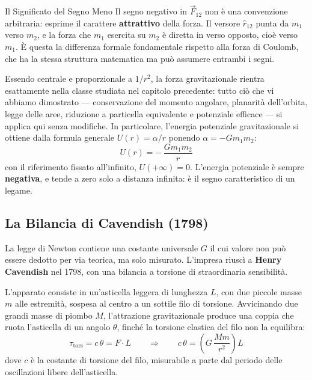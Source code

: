 \begin{attenzione}{Il Significato del Segno Meno}
Il segno negativo in $\vec{F}_{12}$ non è una convenzione arbitraria: esprime il carattere \textbf{attrattivo} della forza. Il versore $\hat{r}_{12}$ punta da $m_1$ verso $m_2$, e la forza che $m_1$ esercita su $m_2$ è diretta in verso opposto, cioè verso $m_1$. È questa la differenza formale fondamentale rispetto alla forza di Coulomb, che ha la stessa struttura matematica ma può assumere entrambi i segni.
\end{attenzione}

Essendo centrale e proporzionale a $1/r^2$, la forza gravitazionale rientra esattamente nella classe studiata nel capitolo precedente: tutto ciò che vi abbiamo dimostrato --- conservazione del momento angolare, planarità dell'orbita, legge delle aree, riduzione a particella equivalente e potenziale efficace --- si applica qui senza modifiche. In particolare, l'energia potenziale gravitazionale si ottiene dalla formula generale $U(r) = \alpha/r$ ponendo $\alpha = -Gm_1m_2$:
\begin{equation}
    U(r) = - \, \frac{G m_1 m_2}{r}
\end{equation}
con il riferimento fissato all'infinito, $U(+\infty) = 0$. L'energia potenziale è sempre \textbf{negativa}, e tende a zero solo a distanza infinita: è il segno caratteristico di un legame.

\subsection{La Bilancia di Cavendish (1798)}

La legge di Newton contiene una costante universale $G$ il cui valore non può essere dedotto per via teorica, ma solo misurato. L'impresa riuscì a \textbf{Henry Cavendish} nel 1798, con una bilancia a torsione di straordinaria sensibilità.

L'apparato consiste in un'asticella leggera di lunghezza $L$, con due piccole masse $m$ alle estremità, sospesa al centro a un sottile filo di torsione. Avvicinando due grandi masse di piombo $M$, l'attrazione gravitazionale produce una coppia che ruota l'asticella di un angolo $\theta$, finché la torsione elastica del filo non la equilibra:
\begin{equation}
    \tau_{\text{tors}} = c \, \theta = F \cdot L
    \qquad \Longrightarrow \qquad
    c \, \theta = \left( G \, \frac{M m}{r^2} \right) L
\end{equation}
dove $c$ è la costante di torsione del filo, misurabile a parte dal periodo delle oscillazioni libere dell'asticella.

